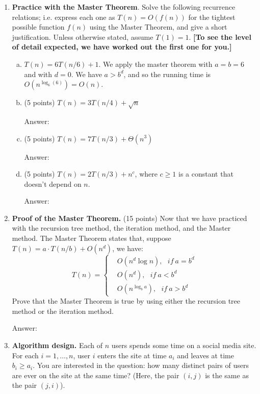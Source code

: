 \documentclass[12pt]{article}
\begin{document}
\begin{enumerate}
  \item \textbf{Practice with the Master Theorem}. Solve the following recurrence relations; i.e. express each one as $T(n) = O(f(n))$ for the tightest possible function $f(n)$ using the Master Theorem, and give a short justification. Unless otherwise stated, assume $T(1) = 1$.
    \textbf{[To see the level of detail expected, we have worked out the first one for you.]}

    \begin{enumerate}[(a)]

      \item[(z)] $T(n) = 6T(n/6) + 1$.  We apply the master theorem with $a = b = 6$ and with $d = 0$.  We have $a > b^d$, and so the running time is $O(n^{\log_6(6)}) = O(n)$.

      \item (5 points) $T(n) = 3 T(n/4) + \sqrt{n}$
      
      {\color{blue}Answer: }
      
      \item (5 points) $T(n) = 7 T(n/3) + \Theta(n^3)$
      
      {\color{blue}Answer: }

      \item (5 points) $T(n) = 2 T(n/3) + n^c$, where $c \geq 1$ is a constant that doesn't depend on $n$.
      
      {\color{blue}Answer: }

    \end{enumerate}
  
  
  \item \textbf{Proof of the Master Theorem.} (15 points) Now that we have practiced with the recursion tree method, the iteration method, and the Master method. The Master Theorem states that, suppose $T(n)=a\cdot T(n/b)+O(n^d)$, we have:
  \begin{displaymath}
  T(n)=\left\{
	\begin{aligned}
	&O(n^d\log n),~~~if~a=b^d\\
	&O(n^d),~~~if~a<b^d\\
	&O(n^{\log_b a}),~~~if~a>b^d
	\end{aligned}
	\right.
  \end{displaymath}
  Prove that the Master Theorem is true by using either the recursion tree method or the iteration method.
  
  {\color{blue}Answer: }
  
  
  \item \textbf{Algorithm design.} Each of $n$ users spends some time on a social media site.  For each $i = 1,\ldots, n$, user $i$ enters the site at time $a_i$ and leaves at time $b_i \geq a_i$.  You are interested in the question: how many distinct pairs of users are ever on the site at the same time?  (Here, the pair $(i,j)$ is the same as the pair $(j,i)$).


\end{enumerate}
\end{document}
